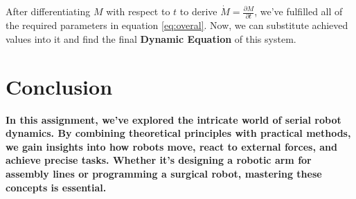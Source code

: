 \documentclass[conference]{IEEEtran}
\begin{document}
\vspace{18px}

After differentiating $M$ with respect to $t$ to derive $\dot{M}=\frac{\partial M}{\partial t}$, we've fulfilled all of the required parameters in equation \ref{eq:overal}. Now, we can substitute achieved values into it and find the final \textbf{Dynamic Equation} of this system.

\twocolumn[
    \centering
\begin{LARGE}
    \begin{align*}
        \renewcommand{\arraystretch}{2}%
        \setlength{\arraycolsep}{15pt}%
        \begin{bmatrix}
        \sigma_1 & \sigma_2 \\
        \sigma_2 & \sigma_3 \\
    \end{bmatrix} \begin{bmatrix}
        \ddot{\theta}_1 \\
        \ddot{\theta}_2
    \end{bmatrix} + \begin{bmatrix}
        \sigma_6 & \sigma_7 \\
        \sigma_7 & \sigma_8 \\
    \end{bmatrix} \begin{bmatrix}
        \dot{\theta}_1 \\
        \dot{\theta}_2
    \end{bmatrix} - \begin{bmatrix}
        0 \\
        \sigma_4
    \end{bmatrix} + \begin{bmatrix}
        0 \\
        \sigma_5
    \end{bmatrix} = \begin{bmatrix}
        \tau_1 \\
        \tau_2
    \end{bmatrix}
\end{align*}
\end{LARGE}
\vspace{60px}
]
\vspace{60px}

\section{Conclusion}
\textbf{In this assignment, we've explored the intricate world of serial robot dynamics. By combining theoretical principles with practical methods, we gain insights into how robots move, react to external forces, and achieve precise tasks. Whether it’s designing a robotic arm for assembly lines or programming a surgical robot, mastering these concepts is essential.}
\vspace{20px}
\end{document}
